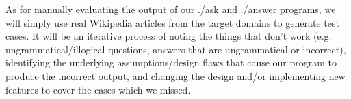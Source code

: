 \documentclass{article}
\begin{document}
As for manually evaluating the output of our ./ask and ./answer programs, we will simply use real Wikipedia articles from the target domains to generate test cases. It will be an iterative process of noting the things that don't work (e.g. ungrammatical/illogical questions, answers that are ungrammatical or incorrect), identifying the underlying assumptions/design flaws that cause our program to produce the incorrect output, and changing the design and/or implementing new features to cover the cases which we missed. 
\end{document}
